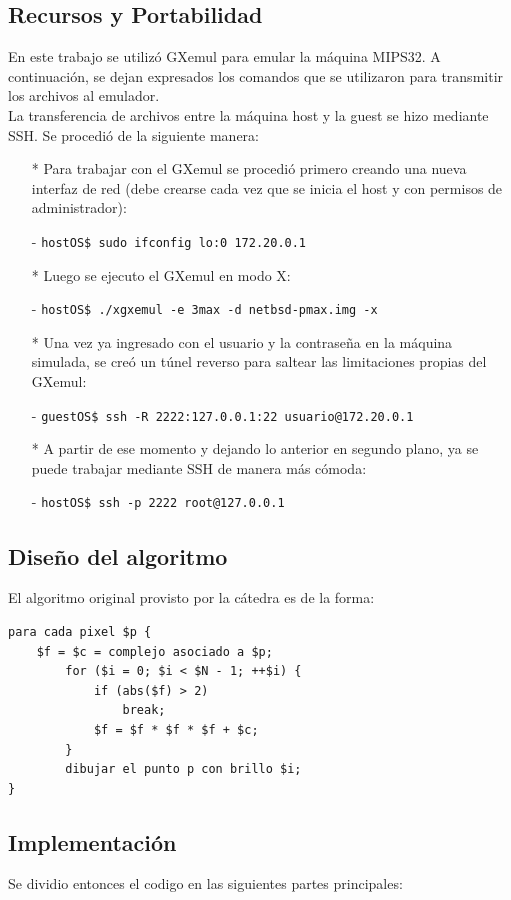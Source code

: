 \documentclass[10pt,spanish,a4paper,openany,notitlepage]{article}
\begin{document}
\subsection{Recursos y Portabilidad}
En este trabajo se utilizó GXemul para emular la máquina MIPS32. A continuación, se dejan expresados los comandos que se utilizaron para transmitir los archivos al emulador.\\
La transferencia de archivos entre la máquina host y la guest se hizo mediante SSH. Se procedió de la siguiente manera:\\
\begin{itemize}
\item[*] Para trabajar con el GXemul se procedió primero creando una nueva interfaz de red (debe crearse cada vez que se inicia el host y con permisos de administrador):
\item[-]\texttt{hostOS\$ sudo ifconfig lo:0 172.20.0.1}
\item[*] Luego se ejecuto el GXemul en modo X:
\item[-]\texttt{hostOS\$ ./xgxemul -e 3max -d netbsd-pmax.img -x}
\item[*] Una vez ya ingresado con el usuario y la contraseña en la máquina simulada, se creó un túnel reverso para saltear las limitaciones propias del GXemul:
\item[-]\texttt{guestOS\$ ssh -R 2222:127.0.0.1:22 usuario@172.20.0.1}
\item[*] A partir de ese momento y dejando lo anterior en segundo plano, ya se puede trabajar mediante SSH de manera más cómoda:
\item[-]\texttt{hostOS\$ ssh -p 2222 root@127.0.0.1}
\end{itemize}
\subsection{Diseño del algoritmo}
El algoritmo original provisto por la cátedra es de la forma:
\begin{framed}
\begin{verbatim}para cada pixel $p {
    $f = $c = complejo asociado a $p;
        for ($i = 0; $i < $N - 1; ++$i) {
            if (abs($f) > 2)
                break;
            $f = $f * $f * $f + $c;
        }
        dibujar el punto p con brillo $i;
}\end{verbatim}
\end{framed}

\subsection{Implementación}
Se dividio entonces el codigo en las siguientes partes principales:
\end{document}
